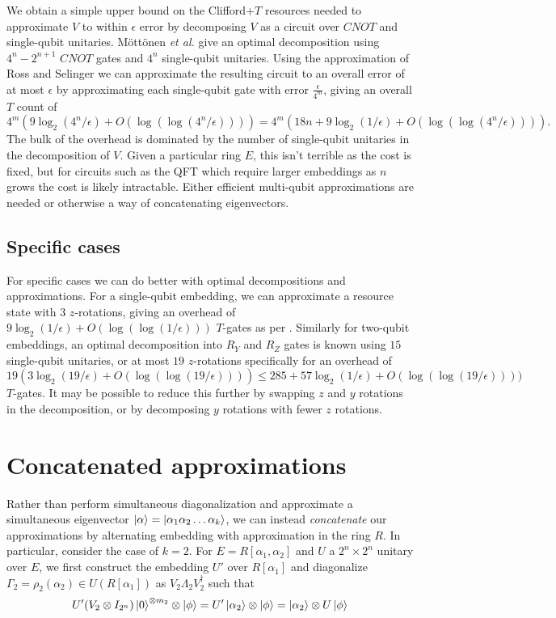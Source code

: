 \documentclass{article}
\theoremstyle{definition}
\theoremstyle{theorem}
\theoremstyle{remark}
\begin{document}
We obtain a simple upper bound on the Clifford+$T$ resources needed to approximate $V$ to within $\epsilon$ error by decomposing $V$ as a circuit over $CNOT$ and single-qubit unitaries. M\"ott\"onen \textit{et al.} \cite{general} give an optimal decomposition using $4^n-2^{n+1}$ $CNOT$ gates and $4^n$ single-qubit unitaries. Using the approximation of Ross and Selinger \cite{zrot} we can approximate the resulting circuit to an overall error of at most $\epsilon$ by approximating each single-qubit gate with error $\frac{\epsilon}{4^m}$, giving an overall $T$ count of
\[
	4^m(9\log_2(4^n/\epsilon) + O(\log(\log(4^n/\epsilon)))) = 4^m(18n + 9\log_2(1/\epsilon) + O(\log(\log(4^n/\epsilon)))).
\]
The bulk of the overhead is dominated by the number of single-qubit unitaries in the decomposition of $V$. Given a particular ring $E$, this isn't terrible as the cost is fixed, but for circuits such as the QFT which require larger embeddings as $n$ grows the cost is likely intractable. Either efficient multi-qubit approximations are needed or otherwise a way of concatenating eigenvectors.

\subsection{Specific cases}

For specific cases we can do better with optimal decompositions and approximations. For a single-qubit embedding, we can approximate a resource state with $3$ $z$-rotations, giving an overhead of $9\log_2(1/\epsilon) + O(\log(\log(1/\epsilon)))$ $T$-gates as per \cite{zrot}. Similarly for two-qubit embeddings, an optimal decomposition into $R_Y$ and $R_Z$ gates is known using $15$ single-qubit unitaries, or at most $19$ $z$-rotations specifically for an overhead of 
\[
	19(3\log_2(19/\epsilon) + O(\log(\log(19/\epsilon)))) \leq 285 + 57\log_2(1/\epsilon) + O(\log(\log(19/\epsilon))))
\]
$T$-gates. It may be possible to reduce this further by swapping $z$ and $y$ rotations in the decomposition, or by decomposing $y$ rotations with fewer $z$ rotations.

\section{Concatenated approximations}

Rather than perform simultaneous diagonalization and approximate a simultaneous eigenvector $\ket{\alpha}=\ket{\alpha_1\alpha_2\dots\alpha_k}$, we can instead \emph{concatenate} our approximations by alternating embedding with approximation in the ring $R$. In particular, consider the case of $k=2$. For $E=R[\alpha_1,\alpha_2]$ and $U$ a $2^n\times 2^n$ unitary over $E$, we first construct the embedding $U'$ over $R[\alpha_1]$ and diagonalize $\Gamma_2=\rho_2(\alpha_2)\in U(R[\alpha_1])$ as $V_2\Lambda_2V_2^\dagger$ such that
\[
	U'(V_2\otimes I_{2^n})\ket{0}^{\otimes m_2}\otimes\ket{\phi} = U'\ket{\alpha_2}\otimes\ket{\phi} = \ket{\alpha_2}\otimes U\ket{\phi}
\]
\end{document}
